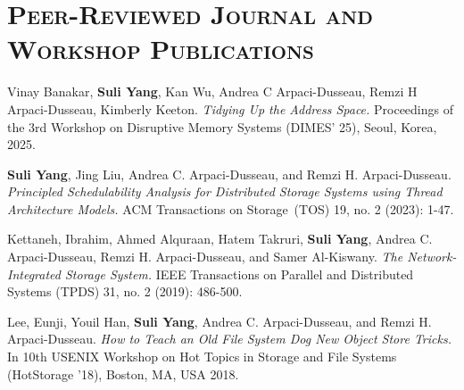 \documentclass[10pt, letterpaper]{article}
\begin{document}
\section*{\textsc{Peer-Reviewed Journal and Workshop Publications}}

\begin{enumerate}[fullwidth,itemindent=1em,label={[\arabic*]}]
     \item Vinay Banakar, {\bf Suli Yang}, Kan Wu, Andrea C Arpaci-Dusseau, Remzi H Arpaci-Dusseau, Kimberly Keeton. \textit{Tidying Up the Address Space.} 
      Proceedings of the 3rd Workshop on Disruptive Memory Systems (DIMES' 25), Seoul, Korea, 2025.

      \item {\bf Suli Yang}, Jing Liu, Andrea C. Arpaci-Dusseau, and Remzi H. Arpaci-Dusseau. \textit{Principled Schedulability Analysis for Distributed Storage Systems using Thread Architecture Models.} 
      ACM Transactions on Storage~(TOS) 19, no. 2 (2023): 1-47.
      
      \item Kettaneh, Ibrahim, Ahmed Alquraan, Hatem Takruri, {\bf Suli Yang}, Andrea C. Arpaci-Dusseau, Remzi H. Arpaci-Dusseau, and Samer Al-Kiswany. \textit{The Network-Integrated Storage System.} 
      IEEE Transactions on Parallel and Distributed Systems (TPDS) 31, no. 2 (2019): 486-500.

       \item Lee, Eunji, Youil Han, {\bf Suli Yang}, Andrea C. Arpaci-Dusseau, and Remzi H. Arpaci-Dusseau. \textit{How to Teach an Old File System Dog New Object Store Tricks.} 
        In 10th {USENIX} Workshop on Hot Topics in Storage and File Systems (HotStorage '18), Boston, MA, USA 2018.
	
\end{enumerate}

\end{document}
